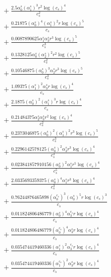 \documentclass[10pt]{article}
\begin{document}
\begin{align*}
&{}  + \frac{2.5 \alpha_{0}^s \left(\alpha_{1}^s\right)^{3} r^{2} \log{\left(c_{s} \right)}^{4}}{c_{s}^{2}} \\
&{}  + \frac{0.21875 \left(\alpha_{0}^s\right)^{4} \left(\alpha_{1}^s\right)^{2} r \log{\left(c_{s} \right)}^{5}}{c_{s}} \\
&{}  + \frac{0.0087890625 \alpha_{1}^s \alpha_{3}^s r^{3} \log{\left(c_{s} \right)}^{5}}{c_{s}^{3}} \\
&{}  + \frac{0.1328125 \alpha_{0}^s \left(\alpha_{2}^s\right)^{2} r^{2} \log{\left(c_{s} \right)}^{5}}{c_{s}^{2}} \\
&{}  + \frac{0.10546875 \left(\alpha_{0}^s\right)^{3} \alpha_{2}^s r^{3} \log{\left(c_{s} \right)}^{5}}{c_{s}^{3}} \\
&{}  + \frac{1.09375 \left(\alpha_{1}^s\right)^{2} \alpha_{3}^s r \log{\left(c_{s} \right)}^{4}}{c_{s}} \\
&{}  + \frac{2.1875 \left(\alpha_{0}^s\right)^{2} \left(\alpha_{1}^s\right)^{3} r \log{\left(c_{s} \right)}^{4}}{c_{s}} \\
&{}  + \frac{0.21484375 \alpha_{2}^s \alpha_{3}^s r^{2} \log{\left(c_{s} \right)}^{4}}{c_{s}^{2}} \\
&{}  + \frac{0.2373046875 \left(\alpha_{0}^s\right)^{2} \left(\alpha_{1}^s\right)^{2} r^{3} \log{\left(c_{s} \right)}^{5}}{c_{s}^{3}} \\
&{}  + \frac{0.2296142578125 \left(\alpha_{0}^s\right)^{2} \alpha_{3}^s r^{3} \log{\left(c_{s} \right)}^{4}}{c_{s}^{3}} \\
&{}  + \frac{0.023841857910156 \left(\alpha_{0}^s\right)^{2} \alpha_{1}^s r^{5} \log{\left(c_{s} \right)}^{4}}{c_{s}^{5}} \\
&{}  + \frac{2.0335693359375 \left(\alpha_{0}^s\right)^{4} \alpha_{1}^s r^{3} \log{\left(c_{s} \right)}^{4}}{c_{s}^{3}} \\
&{}  + \frac{0.76244876465898 \left(\alpha_{0}^{c_s}\right)^{3} \left(\alpha_{0}^s\right)^{5} r \log{\left(c_{s} \right)}^{3}}{c_{s}} \\
&{}  + \frac{0.011824806486779 \left(\alpha_{0}^s\right)^{4} \alpha_{3}^{c_s} r \log{\left(c_{s} \right)}^{4}}{c_{s}} \\
&{}  + \frac{0.011824806486779 \left(\alpha_{0}^{c_s}\right)^{4} \alpha_{3}^s r \log{\left(c_{s} \right)}^{4}}{c_{s}} \\
&{}  + \frac{0.035474419460336 \left(\alpha_{1}^s\right)^{2} \alpha_{3}^{c_s} r \log{\left(c_{s} \right)}^{4}}{c_{s}} \\
&{}  + \frac{0.035474419460336 \left(\alpha_{1}^{c_s}\right)^{2} \alpha_{3}^s r \log{\left(c_{s} \right)}^{4}}{c_{s}} \\

\end{align*}
\end{document}
